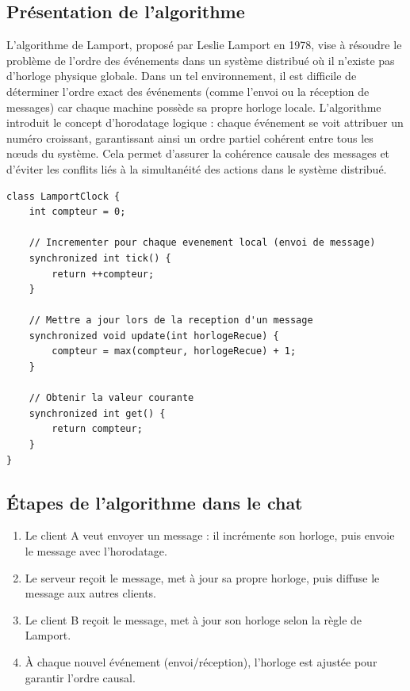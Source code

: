 \documentclass[a4paper,12pt]{article}
\begin{document}
\subsection{Présentation de l'algorithme}
L'algorithme de Lamport, proposé par Leslie Lamport en 1978, vise à résoudre le problème de l'ordre des événements dans un système distribué où il n'existe pas d'horloge physique globale. Dans un tel environnement, il est difficile de déterminer l'ordre exact des événements (comme l'envoi ou la réception de messages) car chaque machine possède sa propre horloge locale. L'algorithme introduit le concept d'horodatage logique : chaque événement se voit attribuer un numéro croissant, garantissant ainsi un ordre partiel cohérent entre tous les nœuds du système. Cela permet d'assurer la cohérence causale des messages et d'éviter les conflits liés à la simultanéité des actions dans le système distribué.
\begin{lstlisting}
class LamportClock {
    int compteur = 0;

    // Incrementer pour chaque evenement local (envoi de message)
    synchronized int tick() {
        return ++compteur;
    }

    // Mettre a jour lors de la reception d'un message
    synchronized void update(int horlogeRecue) {
        compteur = max(compteur, horlogeRecue) + 1;
    }

    // Obtenir la valeur courante
    synchronized int get() {
        return compteur;
    }
}
\end{lstlisting}

\subsection{Étapes de l'algorithme dans le chat}
\begin{enumerate}
    \item Le client A veut envoyer un message : il incrémente son horloge, puis envoie le message avec l'horodatage.
    \item Le serveur reçoit le message, met à jour sa propre horloge, puis diffuse le message aux autres clients.
    \item Le client B reçoit le message, met à jour son horloge selon la règle de Lamport.
    \item À chaque nouvel événement (envoi/réception), l'horloge est ajustée pour garantir l'ordre causal.
\end{enumerate}
\end{document}
